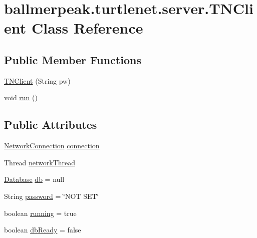 \hypertarget{classballmerpeak_1_1turtlenet_1_1server_1_1TNClient}{\section{ballmerpeak.\-turtlenet.\-server.\-T\-N\-Client Class Reference}
\label{classballmerpeak_1_1turtlenet_1_1server_1_1TNClient}
}
\subsection*{Public Member Functions}
\begin{DoxyCompactItemize}
\item 
\hyperlink{classballmerpeak_1_1turtlenet_1_1server_1_1TNClient_ac4a0dada0133edeee842b9335c350454}{T\-N\-Client} (String pw)
\item 
void \hyperlink{classballmerpeak_1_1turtlenet_1_1server_1_1TNClient_adc8a19a614bf011afa7ca0e2435de031}{run} ()
\end{DoxyCompactItemize}
\subsection*{Public Attributes}
\begin{DoxyCompactItemize}
\item 
\hyperlink{classballmerpeak_1_1turtlenet_1_1server_1_1NetworkConnection}{Network\-Connection} \hyperlink{classballmerpeak_1_1turtlenet_1_1server_1_1TNClient_a5f3a2db779658358496e57ddc06ca612}{connection}
\item 
Thread \hyperlink{classballmerpeak_1_1turtlenet_1_1server_1_1TNClient_a30362e2dd295df5ecaadc7fed3374ea0}{network\-Thread}
\item 
\hyperlink{classballmerpeak_1_1turtlenet_1_1server_1_1Database}{Database} \hyperlink{classballmerpeak_1_1turtlenet_1_1server_1_1TNClient_a71515570b30a73fbd91017c811dad2ba}{db} = null
\item 
String \hyperlink{classballmerpeak_1_1turtlenet_1_1server_1_1TNClient_a9307f6efc05ddda37f9355b6f13953d9}{password} = \char`\"{}N\-O\-T S\-E\-T\char`\"{}
\item 
boolean \hyperlink{classballmerpeak_1_1turtlenet_1_1server_1_1TNClient_af8bbdf5ff58fedc8c99ef82b17654a94}{running} = true
\item 
boolean \hyperlink{classballmerpeak_1_1turtlenet_1_1server_1_1TNClient_aec7ed1884c5ebaaff15d83de15086ef2}{db\-Ready} = false
\end{DoxyCompactItemize}


